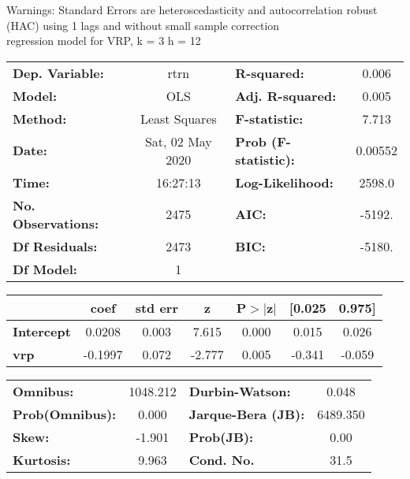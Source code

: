 Warnings: \newline
 [1] Standard Errors are heteroscedasticity and autocorrelation robust (HAC) using 1 lags and without small sample correction\\ 

regression model for VRP, k = 3 h = 12\begin{center}
\begin{tabular}{lclc}
\toprule
\textbf{Dep. Variable:}    &       rtrn       & \textbf{  R-squared:         } &     0.006   \\
\textbf{Model:}            &       OLS        & \textbf{  Adj. R-squared:    } &     0.005   \\
\textbf{Method:}           &  Least Squares   & \textbf{  F-statistic:       } &     7.713   \\
\textbf{Date:}             & Sat, 02 May 2020 & \textbf{  Prob (F-statistic):} &  0.00552    \\
\textbf{Time:}             &     16:27:13     & \textbf{  Log-Likelihood:    } &    2598.0   \\
\textbf{No. Observations:} &        2475      & \textbf{  AIC:               } &    -5192.   \\
\textbf{Df Residuals:}     &        2473      & \textbf{  BIC:               } &    -5180.   \\
\textbf{Df Model:}         &           1      & \textbf{                     } &             \\
\bottomrule
\end{tabular}
\begin{tabular}{lcccccc}
                   & \textbf{coef} & \textbf{std err} & \textbf{z} & \textbf{P$> |$z$|$} & \textbf{[0.025} & \textbf{0.975]}  \\
\midrule
\textbf{Intercept} &       0.0208  &        0.003     &     7.615  &         0.000        &        0.015    &        0.026     \\
\textbf{vrp}       &      -0.1997  &        0.072     &    -2.777  &         0.005        &       -0.341    &       -0.059     \\
\bottomrule
\end{tabular}
\begin{tabular}{lclc}
\textbf{Omnibus:}       & 1048.212 & \textbf{  Durbin-Watson:     } &    0.048  \\
\textbf{Prob(Omnibus):} &   0.000  & \textbf{  Jarque-Bera (JB):  } & 6489.350  \\
\textbf{Skew:}          &  -1.901  & \textbf{  Prob(JB):          } &     0.00  \\
\textbf{Kurtosis:}      &   9.963  & \textbf{  Cond. No.          } &     31.5  \\
\bottomrule
\end{tabular}
\end{center}

